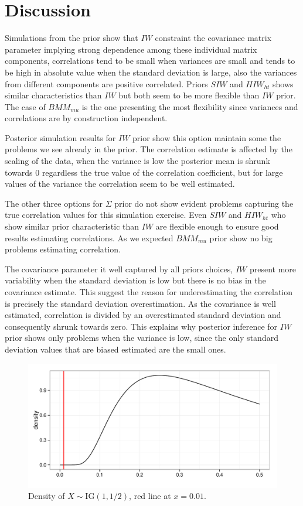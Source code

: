 \documentclass[a4paper]{article}
\begin{document}
\section{Discussion} 

Simulations from the prior show that $IW$ constraint the covariance matrix parameter implying strong dependence among these individual matrix components, correlations tend to be small when variances are small and tends to be high in absolute value when the standard deviation is large, also the variances from different components are positive correlated.  Priors $SIW$ and $HIW_{ht}$ shows similar characteristics than $IW$ but both seem to be more flexible than $IW$ prior. The case of $BMM_{mu}$ is the one presenting the most flexibility since variances and correlations are by construction independent.

Posterior simulation results for $IW$ prior show this option maintain some the problems we see already in the prior.  The correlation estimate is affected by the scaling of the data, when the variance is low the posterior mean is shrunk towards 0 regardless the true value of the correlation coefficient, but for large values of the variance the correlation seem to be well estimated.  

The other three options for $\Sigma$ prior do not show evident problems capturing the true correlation values for this simulation exercise. Even  $SIW$ and $HIW_{ht}$ who show similar prior characteristic than $IW$ are flexible enough to ensure good results estimating correlations. As we expected $BMM_{mu}$ prior show no big problems estimating  correlation. 

The covariance parameter it well captured by all priors choices, $IW$ present more variability when the standard deviation is low but there is no bias in the covariance estimate. This suggest the reason for underestimating the correlation is precisely the standard deviation overestimation. As the covariance is well estimated, correlation is divided by an overestimated standard deviation and consequently shrunk towards zero. This explains why posterior inference for $IW$ prior shows only problems when the variance is low, since the only standard deviation values that are biased estimated are the small ones. 

\begin{figure}[hbpt]
\centering
\includegraphics[width=\textwidth]{ig}
 \vspace{-.5in}
\caption{Density of $X\sim \mbox{IG}(1, 1/2)$, red line at $x=0.01$. \label{igamma} }
\end{figure}
\end{document}
